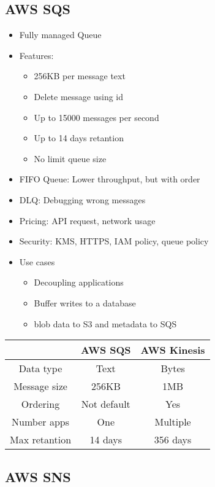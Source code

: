 \documentclass[../../main.tex]{subfiles}
\begin{document}
\subsection{AWS SQS}
\begin{itemize}
    \item Fully managed Queue
    \item Features:
    \begin{itemize}
        \item 256KB per message text
        \item Delete message using id
        \item Up to 15000 messages per second
        \item Up to 14 days retantion
        \item No limit queue size
    \end{itemize}
    \item FIFO Queue: Lower throughput, but with order
    \item DLQ: Debugging wrong messages
    \item Pricing: API request, network usage
    \item Security: KMS, HTTPS, IAM policy, queue policy
    \item Use cases
    \begin{itemize}
        \item Decoupling applications
        \item Buffer writes to a database
        \item blob data to S3 and metadata to SQS
    \end{itemize}
\end{itemize}

\begin{center}
    \begin{tabular}{|c|c|c|}
    \hline
    & AWS SQS & AWS Kinesis \\
    \hline
    \hline
    Data type & Text & Bytes \\
    \hline
    Message size & 256KB & 1MB \\
    \hline
    Ordering & Not default & Yes \\
    \hline
    Number apps & One & Multiple \\
    \hline
    Max retantion & 14 days & 356 days \\
    \hline
    \end{tabular}
\end{center}
\subsection{AWS SNS}
\end{document}
